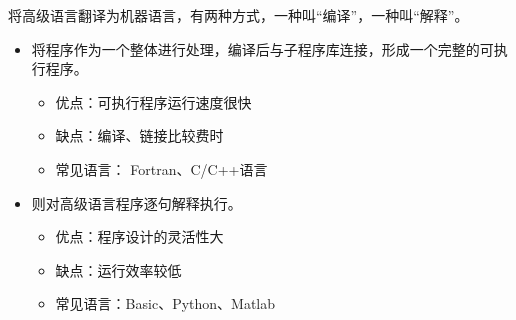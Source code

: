 \begin{frame}

将高级语言翻译为机器语言，有两种方式，一种叫“编译”，一种叫“解释”。 \vspace{0.05in}

\begin{itemize}
\item
  将程序作为一个整体进行处理，编译后与子程序库连接，形成一个完整的可执行程序。
  \begin{itemize}
  \item  优点：可执行程序运行速度很快
  \item  缺点：编译、链接比较费时
  \item 常见语言： Fortran、C/C++语言
  \end{itemize}
\item
  则对高级语言程序逐句解释执行。
  \begin{itemize}
  \item 优点：程序设计的灵活性大
  \item 缺点：运行效率较低
  \item 常见语言：Basic、Python、Matlab
  \end{itemize}
\end{itemize}
\end{frame}
